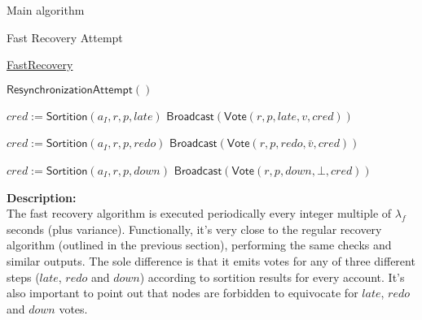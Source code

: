 \documentclass[10pt,a4paper]{article}
\begin{document}
\begin{section}{Main algorithm}
\begin{subsection}{Fast Recovery Attempt}\label{ssect:FastRecovery}

    \begin{algorithm}[H]
        \caption{\underline{FastRecovery}}
        \label{algo:fast-recovery}
        \begin{algorithmic}[1]


        \State $\mathsf{ResynchronizationAttempt}()$
    
                \State $cred := \mathsf{Sortition}(a_{I}, r,p,late)$
                    \State $\mathsf{Broadcast}(\mathsf{Vote}(r, p, late, v, cred))$
                \EndIf

                    \State $cred := 
                    \mathsf{Sortition}(a_{I},r,p, redo)$
                        \State $\mathsf{Broadcast}(\mathsf{Vote}(r,p,redo,\bar{v}, cred))$
                    \EndIf

            \Else
                \State $cred := 
                \mathsf{Sortition}(a_{I}, r,p, down)$
                    \State $\mathsf{Broadcast}(\mathsf{Vote}(r,p,down,\bot, cred))$
                \EndIf
            \EndIf
        \EndFor

        \EndFunction
        \end{algorithmic}
    \end{algorithm}

    
    
    \noindent \textbf{Description:}\\
    The fast recovery algorithm is executed periodically every integer multiple of $\lambda_f$
    seconds (plus variance).
    Functionally, it's very close to the regular recovery algorithm (outlined in the previous section), 
    performing the same checks and similar outputs. The sole difference is that it emits votes 
    for any of three different steps ($late$, $redo$ and $down$) according to sortition 
    results for every account.
    It's also important to point out that nodes are forbidden to equivocate for $late$, $redo$ and $down$ votes.
\end{subsection}


\end{section}
\end{document}
